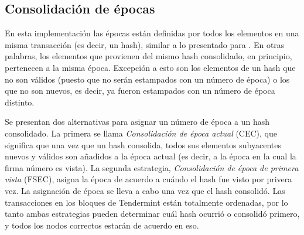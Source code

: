 %




\subsection{Consolidación de épocas}\label{subsubsec:consolidation}

En esta implementación las épocas están definidas por todos los elementos en una misma transacción
(es decir, un hash), similar
a lo presentado para \compresschain.
%
En otras palabras, los elementos que provienen del mismo hash consolidado, en principio,
pertenecen a la misma época.
%
Excepción a esto son los elementos de un hash que no son válidos (puesto que no serán
estampados con un número de época) o los que no son nuevos, es decir, ya fueron estampados
con un número de época distinto.

%
%

%

Se presentan dos alternativas para asignar un número de época a un hash consolidado.
%
La primera se llama \textit{Consolidación de época actual} (CEC), que significa que 
una vez que un hash consolida, todos sus elementos subyacentes nuevos y válidos son
añadidos a la época actual
(es decir, a la época en la cual la firma número \SPH es vista).
%
La segunda estrategia, \textit{Consolidación de época de primera vista} (FSEC), asigna la época
de acuerdo a cuándo el hash fue visto por privera vez. La asignación de época se lleva
a cabo una vez que el hash consolidó. 
%
Las transacciones
en los bloques de Tendermint están totalmente ordenadas,
por lo tanto ambas estrategias pueden determinar cuál hash ocurrió o consolidó primero, y
todos los nodos correctos estarán de acuerdo en eso.

